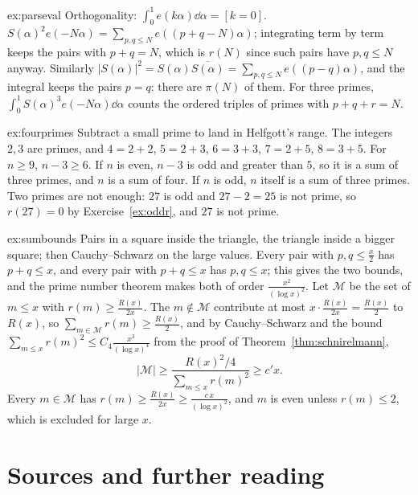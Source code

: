 \begin{solution}{ex:parseval}
\idea Orthogonality: $\int_0^1e(k\alpha)\dd\alpha=[k=0]$.
\writeup $S(\alpha)^2e(-N\alpha)=\sum_{p,q\le N}e((p+q-N)\alpha)$; integrating term by term keeps the pairs with $p+q=N$, which is $r(N)$ since such pairs have
$p,q\le N$ anyway. Similarly $|S(\alpha)|^2=S(\alpha)\overline{S(\alpha)}=\sum_{p,q\le N}e((p-q)\alpha)$, and the integral keeps the pairs $p=q$: there are
$\pi(N)$ of them. For three primes, $\int_0^1S(\alpha)^3e(-N\alpha)\dd\alpha$ counts the ordered triples of primes with $p+q+r=N$.
\end{solution}

\begin{solution}{ex:fourprimes}
\idea Subtract a small prime to land in Helfgott's range.
\writeup The integers $2,3$ are primes, and $4=2+2$, $5=2+3$, $6=3+3$, $7=2+5$, $8=3+5$. For $n\ge9$, $n-3\ge6$. If $n$ is even, $n-3$ is odd and greater than
$5$, so it is a sum of three primes, and $n$ is a sum of four. If $n$ is odd, $n$ itself is a sum of three primes. Two primes are not enough: $27$ is odd and
$27-2=25$ is not prime, so $r(27)=0$ by Exercise~\ref{ex:oddr}, and $27$ is not prime.
\end{solution}

\begin{solution}{ex:sumbounds}
\idea Pairs in a square inside the triangle, the triangle inside a bigger square; then Cauchy--Schwarz on the large values.
\writeup Every pair with $p,q\le\frac x2$ has $p+q\le x$, and every pair with $p+q\le x$ has $p,q\le x$; this gives the two bounds, and the prime number theorem
makes both of order $\frac{x^2}{(\log x)^2}$. Let $\mathcal M$ be the set of $m\le x$ with $r(m)\ge\frac{R(x)}{2x}$. The $m\notin\mathcal M$ contribute at most
$x\cdot\frac{R(x)}{2x}=\frac{R(x)}2$ to $R(x)$, so $\sum_{m\in\mathcal M}r(m)\ge\frac{R(x)}2$, and by Cauchy--Schwarz and the bound
$\sum_{m\le x}r(m)^2\le C_4\frac{x^3}{(\log x)^4}$ from the proof of Theorem~\ref{thm:schnirelmann},
\[
|\mathcal M|\ge\frac{R(x)^2/4}{\sum_{m\le x}r(m)^2}\ge c'x.
\]
Every $m\in\mathcal M$ has $r(m)\ge\frac{R(x)}{2x}\ge\frac{c\,x}{(\log x)^2}$, and $m$ is even unless $r(m)\le2$, which is excluded for large $x$.
\end{solution}

\section*{Sources and further reading}

